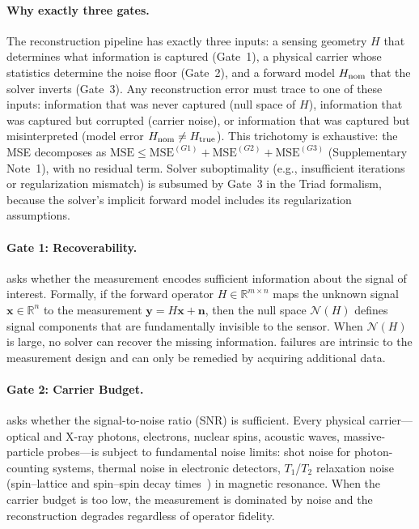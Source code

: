 \paragraph{Why exactly three gates.}
The reconstruction pipeline has exactly three inputs: a sensing geometry $H$ that determines what information is captured (Gate~1), a physical carrier whose statistics determine the noise floor (Gate~2), and a forward model $H_{\mathrm{nom}}$ that the solver inverts (Gate~3). Any reconstruction error must trace to one of these inputs: information that was never captured (null space of $H$), information that was captured but corrupted (carrier noise), or information that was captured but misinterpreted (model error $H_{\mathrm{nom}} \neq H_{\mathrm{true}}$). This trichotomy is exhaustive: the MSE decomposes as $\mathrm{MSE} \leq \mathrm{MSE}^{(G1)} + \mathrm{MSE}^{(G2)} + \mathrm{MSE}^{(G3)}$ (Supplementary Note~1), with no residual term. Solver suboptimality (e.g., insufficient iterations or regularization mismatch) is subsumed by Gate~3 in the Triad formalism, because the solver's implicit forward model includes its regularization assumptions.

\paragraph{Gate 1: Recoverability.}
\gateone{} asks whether the measurement encodes sufficient information about the signal of interest. Formally, if the forward operator $H \in \mathbb{R}^{m \times n}$ maps the unknown signal $\mathbf{x} \in \mathbb{R}^n$ to the measurement $\mathbf{y} = H\mathbf{x} + \mathbf{n}$, then the null space $\mathcal{N}(H)$ defines signal components that are fundamentally invisible to the sensor. When $\mathcal{N}(H)$ is large, no solver can recover the missing information. \gateone{} failures are intrinsic to the measurement design and can only be remedied by acquiring additional data.

\paragraph{Gate 2: Carrier Budget.}
\gatetwo{} asks whether the signal-to-noise ratio (SNR) is sufficient. Every physical carrier---optical and X-ray photons, electrons, nuclear spins, acoustic waves, massive-particle probes---is subject to fundamental noise limits: shot noise for photon-counting systems, thermal noise in electronic detectors, $T_1$/$T_2$ relaxation noise (spin--lattice and spin--spin decay times~\cite{bloch1946nuclear}) in magnetic resonance. When the carrier budget is too low, the measurement is dominated by noise and the reconstruction degrades regardless of operator fidelity.

